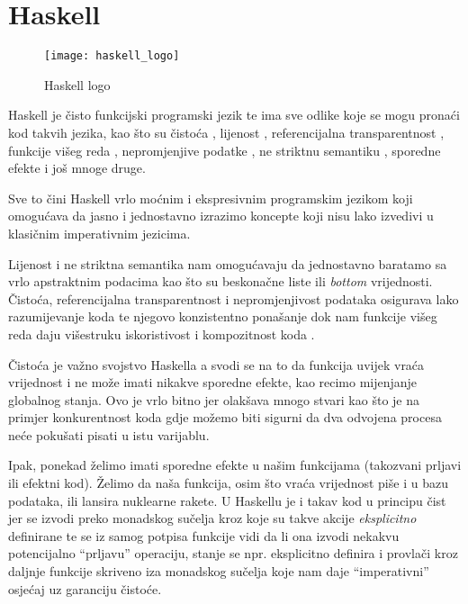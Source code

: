 \chapter{Haskell}

\begin{wrapfigure}[8]{l}{0.25\textwidth}
    \centering
    \texttt{[image: haskell\_logo]}
    \caption{Haskell logo}
    \label{lbl:haskell_logo}
\end{wrapfigure}

Haskell je čisto funkcijski programski jezik te ima sve odlike koje se mogu pronaći kod takvih jezika, kao što su čistoća , lijenost , referencijalna transparentnost , funkcije višeg reda , nepromjenjive podatke , ne striktnu semantiku , sporedne efekte  i još mnoge druge.\cite{haskellorg}

Sve to čini Haskell vrlo moćnim i ekspresivnim programskim jezikom koji omogućava da jasno i jednostavno izrazimo koncepte koji nisu lako izvedivi u klasičnim imperativnim jezicima.

Lijenost i ne striktna semantika nam omogućavaju da jednostavno baratamo sa vrlo apstraktnim podacima kao što su beskonačne liste ili \textit{bottom} vrijednosti. Čistoća, referencijalna transparentnost i nepromjenjivost podataka osigurava lako razumijevanje koda te njegovo konzistentno ponašanje dok nam funkcije višeg reda daju višestruku iskoristivost i kompozitnost koda .

Čistoća je važno svojstvo Haskella a svodi se na to da funkcija uvijek vraća vrijednost i ne može imati nikakve sporedne efekte, kao recimo mijenjanje globalnog stanja. Ovo je vrlo bitno jer olakšava mnogo stvari kao što je na primjer konkurentnost koda gdje možemo biti sigurni da dva odvojena procesa neće pokušati pisati u istu varijablu.

Ipak, ponekad želimo imati sporedne efekte u našim funkcijama (takozvani prljavi ili efektni kod). Želimo da naša funkcija, osim što vraća vrijednost piše i u bazu podataka, ili lansira nuklearne rakete. U Haskellu je i takav kod u principu čist jer se izvodi preko monadskog sučelja kroz koje su takve akcije \textit{eksplicitno} definirane te se iz samog potpisa funkcije vidi da li ona izvodi nekakvu potencijalno ``prljavu'' operaciju, stanje se npr. eksplicitno definira i provlači kroz daljnje funkcije skriveno iza monadskog sučelja koje nam daje ``imperativni'' osjećaj uz garanciju čistoće.\cite{fp_purity}

